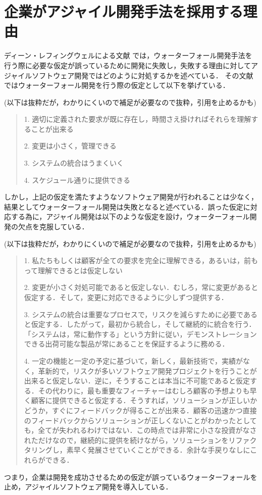 \section{企業がアジャイル開発手法を採用する理由}

ディーン・レフィングウェルによる文献 \cite{leffingwell2010アジャイル開発の本質とスケールアップ}では，ウォーターフォール開発手法を行う際に必要な仮定が誤っているために開発に失敗し，失敗する理由に対してアジャイルソフトウェア開発ではどのように対処するかを述べている．
その文献ではウォーターフォール開発を行う際の仮定として以下を挙げている．

(以下は抜粋だが，わかりにくいので補足が必要なので抜粋，引用を止めるかも)

\begin{quote}
  1. 適切に定義された要求が既に存在し，時間さえ掛ければそれらを理解することが出来る

  2. 変更は小さく，管理できる

  3. システムの統合はうまくいく

  4. スケジュール通りに提供できる
\end{quote}

しかし，上記の仮定を満たすようなソフトウェア開発が行われることは少なく，結果としてウォーターフォール開発は失敗となると述べている．誤った仮定に対応する為に，アジャイル開発は以下のような仮定を設け，ウォーターフォール開発の欠点を克服している．

(以下は抜粋だが，わかりにくいので補足が必要なので抜粋，引用を止めるかも)

\begin{quote}
  1. 私たちもしくは顧客が全ての要求を完全に理解できる，あるいは，前もって理解できるとは仮定しない

  2. 変更が小さく対処可能であると仮定しない．むしろ，常に変更があると仮定する．そして，変更に対応できるように少しずつ提供する．

  3. システムの統合は重要なプロセスで，リスクを減らすために必要であると仮定する．したがって，最初から統合し，そして継続的に統合を行う．「システムは，常に動作する」という方針に従い，デモンストレーションできる出荷可能な製品が常にあることを保証するように務める．

  4. 一定の機能と一定の予定に基づいて，新しく，最新技術で，実績がなく，革新的で，リスクが多いソフトウェア開発プロジェクトを行うことが出来ると仮定しない．逆に，そうすることは本当に不可能であると仮定する．その代わりに，最も重要なフィーチャーはむしろ顧客の予想よりも早く顧客に提供できると仮定する．そうすれば，ソリューションが正しいかどうか，すぐにフィードバックが得ることが出来る．顧客の迅速かつ直接のフィードバックからソリューションが正しくないことがわかったとしても，全てが失われるわけではない．この時点では非常に小さな投資がなされただけなので，継続的に提供を続けながら，ソリューションをリファクタリングし，素早く発展させていくことができる．余計な手戻りなしにこれらができる．

\end{quote}

つまり，企業は開発を成功させるための仮定が誤っているウォーターフォールを止め，アジャイルソフトウェア開発を導入している．
